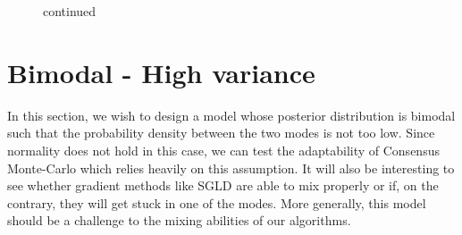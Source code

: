 \documentclass[11pt,a4paper]{report}\usepackage[]{graphicx}\usepackage[]{color}
\begin{document}
\begin{figure}[H]
\ContinuedFloat
\caption{continued}
\centering
{}
\end{figure}


\section{Bimodal - High variance}
\label{DGP2}

In this section, we wish to design a model whose posterior distribution is bimodal such that the probability density between the two modes is not too low. Since normality does not hold in this case, we can test the adaptability of Consensus Monte-Carlo which relies heavily on this assumption. It will also be interesting to see whether gradient methods like SGLD are able to mix properly or if, on the contrary, they will get stuck in one of the modes. More generally, this model should be a challenge to the mixing abilities of our algorithms.
\end{document}
